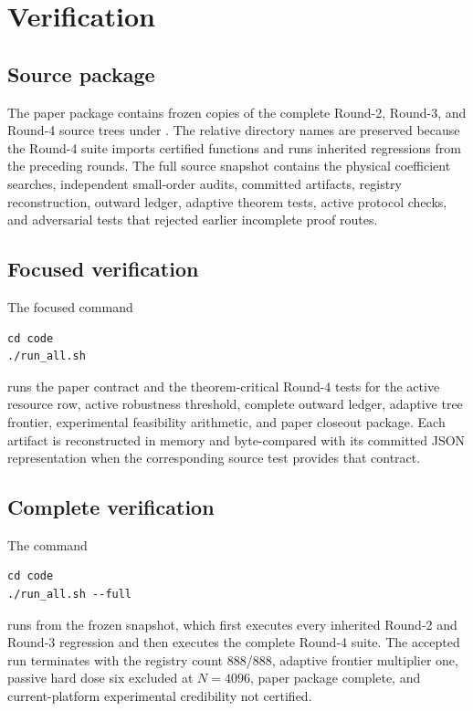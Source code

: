 \section{Verification}
\label{sec:verification}

\subsection{Source package}

The paper package contains frozen copies of the complete Round-2, Round-3, and Round-4 source trees under . The relative directory names are preserved because the Round-4 suite imports certified functions and runs inherited regressions from the preceding rounds. The full source snapshot contains the physical coefficient searches, independent small-order audits, committed artifacts, registry reconstruction, outward ledger, adaptive theorem tests, active protocol checks, and adversarial tests that rejected earlier incomplete proof routes.

\subsection{Focused verification}

The focused command

\begin{verbatim}
cd code
./run_all.sh
\end{verbatim}

runs the paper contract and the theorem-critical Round-4 tests for the active resource row, active robustness threshold, complete outward ledger, adaptive tree frontier, experimental feasibility arithmetic, and paper closeout package. Each artifact is reconstructed in memory and byte-compared with its committed JSON representation when the corresponding source test provides that contract.

\subsection{Complete verification}

The command

\begin{verbatim}
cd code
./run_all.sh --full
\end{verbatim}

runs  from the frozen snapshot, which first executes every inherited Round-2 and Round-3 regression and then executes the complete Round-4 suite. The accepted run terminates with the registry count 888/888, adaptive frontier multiplier one, passive hard dose six excluded at $N=4096$, paper package complete, and current-platform experimental credibility not certified.


